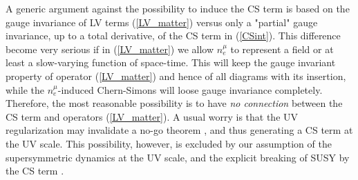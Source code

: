 \documentclass[paper,12pt]{revtex4}
\begin{document}
	A generic argument against the possibility to induce the CS term
    is based on the gauge invariance of  LV terms (\ref{LV_matter})
versus only  a "partial" gauge invariance, up to a total derivative, of the 
    CS term in (\ref{CSint}).
	This difference become very serious if in (\ref{LV_matter})
	we allow $ n_e^\mu $ to represent a field or at least a slow-varying function
	of space-time.  This will keep the gauge invariant property of 
    operator (\ref{LV_matter}) and hence of all diagrams with its insertion,
	while the $ n_e^\mu $-induced Chern-Simons will loose gauge invariance completely.
	Therefore, the most reasonable possibility is to have {\em no connection} between 
	the CS term and operators  (\ref{LV_matter}). A usual worry is that 
	the UV regularization may invalidate a no-go theorem \cite{CG}, and thus generating 
    a CS term at the UV scale. This possibility, however, 
	is excluded by our assumption of the supersymmetric dynamics at the UV scale, and the 
	explicit breaking of SUSY by the CS term \cite{Belich:,GrootNibbelink:2004za}.
\end{document}
